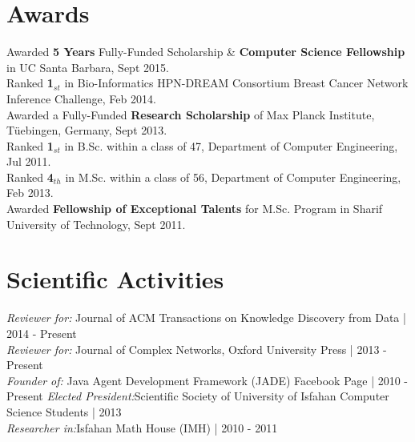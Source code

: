 \documentclass[letter]{res}
\begin{document}
\begin{resume}
\begin{enumerate}[leftmargin=-.01in]
		\end{enumerate}
		
		
		\section{Awards}
		Awarded \textbf{5 Years} Fully-Funded Scholarship \& \textbf{Computer Science Fellowship} in UC Santa Barbara, Sept 2015.\\
		Ranked \textbf{1}$_{st}$ in Bio-Informatics HPN-DREAM Consortium Breast Cancer Network Inference Challenge, Feb 2014.\\
		Awarded a Fully-Funded \textbf{Research Scholarship} of Max Planck Institute, Tüebingen, Germany, Sept 2013.\\
		Ranked \textbf{1}$_{st}$ in B.Sc. within a class of 47, Department of Computer Engineering, Jul 2011.\\
		Ranked \textbf{4}$_{th}$ in M.Sc. within a class of 56, Department of Computer Engineering, Feb 2013.\\
		Awarded \textbf{Fellowship of Exceptional Talents} for M.Sc. Program in Sharif University of Technology, Sept 2011.
		
		
		\section{Scientific Activities}
		{\sl Reviewer for:  }Journal of ACM Transactions on Knowledge Discovery from Data | 2014 - Present\\
		{\sl Reviewer for:  }Journal of Complex Networks, Oxford University Press | 2013 - Present\\
		{\sl Founder of:  }Java Agent Development Framework (JADE) Facebook Page | 2010 - Present
		{\sl Elected President:}Scientific Society of University of Isfahan Computer Science Students | 2013\\
		{\sl Researcher in:}Isfahan Math House (IMH) | 2010 - 2011
		
		

\end{resume}
\end{document}
